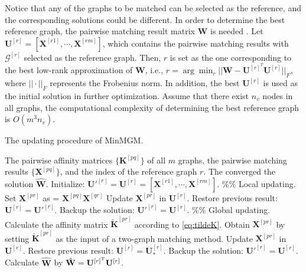 Notice that any of the graphs to be matched can be selected as the reference, and the corresponding solutions could be different. In order to determine the best reference graph, the pairwise matching result matrix $\mathbf W$ is needed \cite{7001592}. Let $\mathbf U^{[r]} = [\mathbf X^{[r1]}, \cdots, \mathbf X^{[rm]}]$, which contains the pairwise matching results with $\mathcal G^{[r]}$ selected as the reference graph. Then, $r$ is set as the one corresponding to the best low-rank approximation of $\mathbf W$, i.e., $r = \arg \min_r ||\mathbf W - \mathbf U^{[r]^T} \mathbf U^{[r]}||_F$, where $||\cdot||_F$ represents the Frobenius norm. In addition, the best $\mathbf U^{[r]}$ is used as the initial solution in further optimization. Assume that there exist $n_v$ nodes in all graphs, the computational complexity of determining the best reference graph is $O(m^3 n_v)$.

\begin{algorithm}[htb!]
    \caption{The updating procedure of MinMGM.}\label{alg}
    \begin{algorithmic}[1]
        \REQUIRE The pairwise affinity matrices $\{\mathbf K^{[pq]}\}$ of all $m$ graphs, the pairwise matching results $\{\mathbf X^{[pq]}\}$, and the index of the reference graph $r$.
        \ENSURE The converged the solution $\hat{\mathbf W}$.
        \STATE Initialize: $\mathbf U'^{[r]} = \mathbf U^{[r]} = [\mathbf X^{[r1]}, \cdots, \mathbf X^{[rm]}]$.
        \STATE \%\% Local updating.
        \REPEAT 
                    \STATE Set $\mathbf X^{[pr]}$ as  = $\mathbf X^{[pq]} \mathbf X^{[qr]}$
                    \STATE Update $\mathbf X^{[pr]}$ in $\mathbf U^{[r]}$.
                        \STATE Restore previous result: $\mathbf U^{[r]} = \mathbf U'^{[r]}$.
                    \ELSE 
                        \STATE Backup the solution: $\mathbf U'^{[r]} = \mathbf U^{[r]}$.
                    \ENDIF
                \ENDFOR
            \ENDFOR
        \STATE \%\% Global updating.
        \REPEAT
            \STATE Calculate the affinity matrix $\widetilde{\mathbf K}^{[pr]}$ according to \cref{eq:tildeK}.
            \STATE Obtain $\mathbf X^{[pr]}$ by setting $\widetilde{\mathbf K}^{[pr]}$ as the input of a two-graph matching method.
            \STATE Update $\mathbf X^{[pr]}$ in $\mathbf U^{[r]}$.
                \STATE Restore previous result: $\mathbf U^{[r]} = \mathbf U^{[r]}_{*}$.
            \ELSE 
                \STATE Backup the solution: $\mathbf U'^{[r]} = \mathbf U^{[r]}$.
            \ENDIF
        \ENDFOR
    \STATE Calculate $\hat{\mathbf W}$ by $\hat{\mathbf W} = \mathbf U^{[r]^{\rm T}} \mathbf U^{[r]}$.
    \end{algorithmic}
\end{algorithm}

